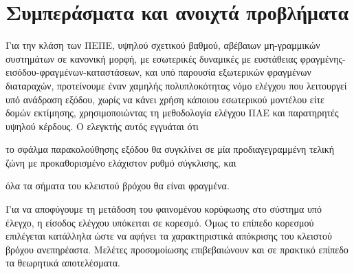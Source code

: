 \chapter{Συμπεράσματα και ανοιχτά προβλήματα}
\label{chap:conclusions}

Για την κλάση των ΠΕΠΕ, υψηλού σχετικού βαθμού, αβέβαιων μη-γραμμικών συστημάτων σε κανονική μορφή, με εσωτερικές δυναμικές με ευστάθειας φραγμένης-εισόδου-φραγμένων-καταστάσεων, και υπό παρουσία εξωτερικών φραγμένων διαταραχών, προτείνουμε έναν χαμηλής πολυπλοκότητας νόμο ελέγχου που λειτουργεί υπό ανάδραση εξόδου, χωρίς να κάνει χρήση κάποιου εσωτερικού μοντέλου είτε δομών εκτίμησης, χρησιμοποιώντας τη μεθοδολογία ελέγχου ΠΑΕ και παρατηρητές υψηλού κέρδους. Ο ελεγκτής αυτός εγγυάται ότι
\begin{enumerate*}[label=(\alph*)]
    \item το σφάλμα παρακολούθησης εξόδου θα συγκλίνει σε μία προδιαγεγραμμένη τελική ζώνη με προκαθορισμένο ελάχιστον ρυθμό σύγκλισης, και 
    \item όλα τα σήματα του κλειστού βρόχου θα είναι φραγμένα.
\end{enumerate*}
Για να αποφύγουμε τη μετάδοση του φαινομένου κορύφωσης στο σύστημα υπό έλεγχο, η είσοδος ελέγχου υπόκειται σε κορεσμό. Όμως το επίπεδο κορεσμού επιλέγεται κατάλληλα ώστε να αφήνει τα χαρακτηριστικά απόκρισης του κλειστού βρόχου ανεπηρέαστα. Μελέτες προσομοίωσης επιβεβαιώνουν και σε πρακτικό επίπεδο τα θεωρητικά αποτελέσματα.

